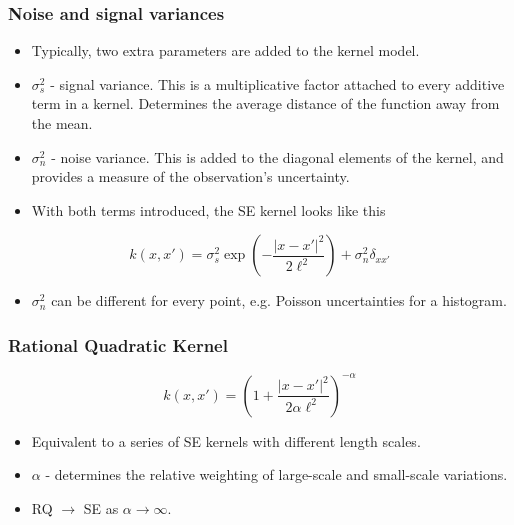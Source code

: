 \begin{frame} \frametitle{Noise and signal variances}
\vspace{-2mm}
\begin{itemize}
  \item Typically, two extra parameters are added to the kernel model.
  \item $\sigma_s^2$ - signal variance.
    This is a multiplicative factor attached to every additive term in a
    kernel.
    Determines the average distance of the function away from the mean.
  \item $\sigma_n^2$ - noise variance.
    This is added to the diagonal elements of the kernel, and provides a
    measure of the observation's uncertainty.
  \item With both terms introduced, the SE kernel looks like this
\end{itemize}
\begin{equation}
  k(x,x') = \sigma_s^2 \exp\left(-\frac{\left|x-x'\right|^2}{2\ell^2}\right)
          + \sigma_n^2 \delta_{xx'}
\end{equation}
\vspace{-2.5mm}
\begin{itemize}
  \item $\sigma_n^2$ can be different for every point, e.g. Poisson
    uncertainties for a histogram.
\end{itemize}
\vspace{-4mm}
\begin{changemargin}{-4.3mm}{0mm}
\end{changemargin}
\end{frame}

\begin{frame} \frametitle{Rational Quadratic Kernel}
\begin{equation}
  k(x,x') = \left( 1 + \frac{\left|x-x'\right|^2}{2\alpha\ell^2} \right)^{-\alpha}
\end{equation}
\begin{itemize}
  \item Equivalent to a series of SE kernels with different length scales.
  \item $\alpha$ - determines the relative weighting of large-scale and
    small-scale variations.
  \item RQ $\rightarrow$ SE as $\alpha\rightarrow\infty$.
\end{itemize}
\begin{center}
\end{center}
\end{frame}


